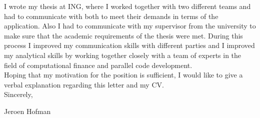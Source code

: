 \documentclass[11pt,a4paper]{article}
\begin{document}
I wrote my thesis at ING, where I worked together with two different teams and had to communicate with both to meet their demands in terms of the application. Also I had to communicate with my supervisor from the university to make sure that the academic requirements of the thesis were met. During this process I improved my communication skills with different parties and I improved my analytical skills by working together closely with a team of experts in the field of computational finance and parallel code development.\\

Hoping that my motivation for the position is sufficient, I would like to give a verbal explanation regarding this letter and my CV.\\

Sincerely,\\
\vspace{15pt}

Jeroen Hofman
\end{document}
